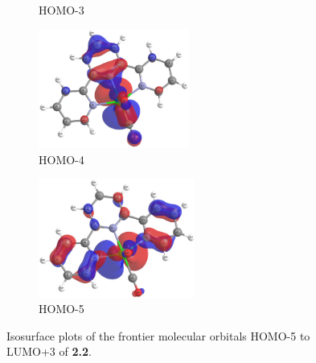 \begin{figure}[!ht]
\begin{subfigure}[b]{0.31\textwidth}
  \caption{HOMO-3}
 \end{subfigure}
 \begin{subfigure}[b]{0.31\textwidth}
  \includegraphics[clip=true, width=\textwidth, height=39mm, keepaspectratio]{images/mos/2h-4.eps}
  \caption{HOMO-4}
 \end{subfigure}
 \begin{subfigure}[b]{0.31\textwidth}
  \includegraphics[clip=true, width=\textwidth, height=39mm, keepaspectratio]{images/mos/2h-5.eps}
  \caption{HOMO-5}
 \end{subfigure}
\caption[Molecular orbitals HOMO-5 to LUMO+3 of \textbf{2.2}.]{Isosurface plots of the frontier molecular orbitals HOMO-5 to LUMO+3 of \textbf{2.2}.}
\label{fig.mo22}
\end{figure} 

